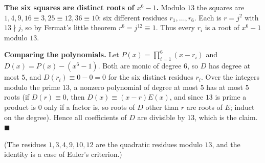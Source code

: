 \textbf{The six squares are distinct roots of $x^6-1$.} Modulo $13$ the squares are $1,4,9,16\equiv3,25\equiv12,36\equiv10$: six different residues $r_1,\dots,r_6$. Each is $r=j^2$ with $13\nmid j$, so by Fermat's little theorem $r^6=j^{12}\equiv1$. Thus every $r_i$ is a root of $x^6-1$ modulo $13$.

\textbf{Comparing the polynomials.} Let $P(x)=\prod_{i=1}^{6}(x-r_i)$ and $D(x)=P(x)-(x^6-1)$. Both are monic of degree $6$, so $D$ has degree at most $5$, and $D(r_i)\equiv0-0=0$ for the six distinct residues $r_i$. Over the integers modulo the prime $13$, a nonzero polynomial of degree at most $5$ has at most $5$ roots (if $D(r)\equiv0$, then $D(x)\equiv(x-r)E(x)$, and since $13$ is prime a product is $0$ only if a factor is, so roots of $D$ other than $r$ are roots of $E$; induct on the degree). Hence all coefficients of $D$ are divisible by $13$, which is the claim. $\blacksquare$

(The residues $1,3,4,9,10,12$ are the quadratic residues modulo $13$, and the identity is a case of Euler's criterion.)
